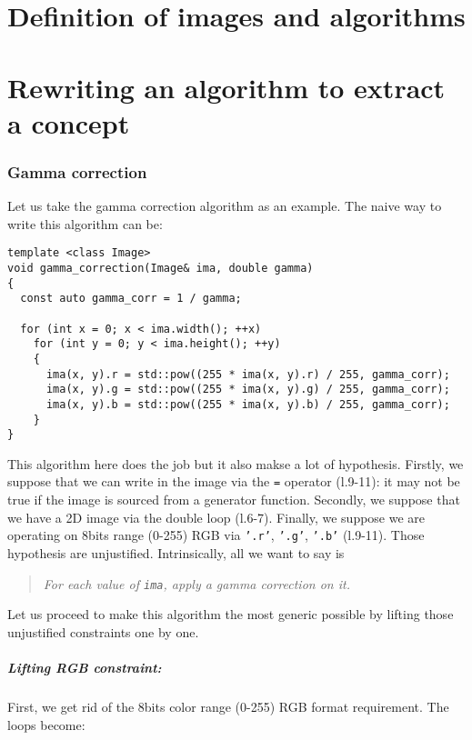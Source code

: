\chapter{Definition of images and algorithms}


\chapter{Rewriting an algorithm to extract a concept}



\subsection{Gamma correction}

Let us take the gamma correction algorithm as an example. The naive way to write this algorithm can be:

\begin{verbatim}
template <class Image>
void gamma_correction(Image& ima, double gamma)
{
  const auto gamma_corr = 1 / gamma;

  for (int x = 0; x < ima.width(); ++x)
    for (int y = 0; y < ima.height(); ++y)
    {
      ima(x, y).r = std::pow((255 * ima(x, y).r) / 255, gamma_corr);
      ima(x, y).g = std::pow((255 * ima(x, y).g) / 255, gamma_corr);
      ima(x, y).b = std::pow((255 * ima(x, y).b) / 255, gamma_corr);
    }
}
\end{verbatim}

\noindent This algorithm here does the job but it also makse a lot of hypothesis. Firstly, we suppose that we can write
in the image via the \texttt{=} operator (l.9-11): it may not be true if the image is sourced from a generator function.
Secondly, we suppose that we have a 2D image via the double loop (l.6-7). Finally, we suppose we are operating on 8bits
range (0-255) RGB via \texttt{'.r'}, \texttt{'.g'}, \texttt{'.b'} (l.9-11). Those hypothesis are unjustified.
Intrinsically, all we want to say is \blockquote{\emph{For each value of \texttt{ima}, apply a gamma correction on
    it.}}. Let us proceed to make this algorithm the most generic possible by lifting those unjustified constraints one by
one.



\paragraph{Lifting RGB constraint:}
First, we get rid of the 8bits color range (0-255) RGB format requirement. The loops become:

